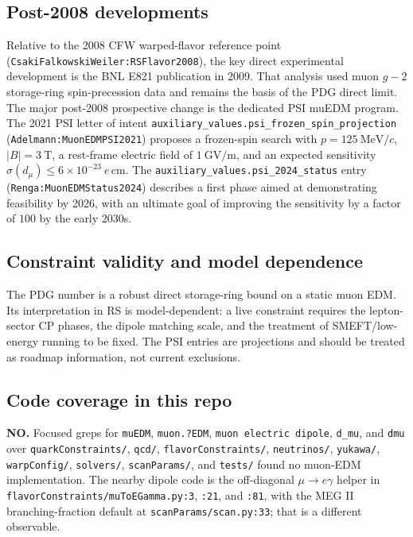 \subsection*{Post-2008 developments}
Relative to the 2008 CFW warped-flavor reference point
(\texttt{CsakiFalkowskiWeiler:RSFlavor2008}), the key direct experimental
development is the BNL E821 publication in 2009.  That analysis used muon
\(g-2\) storage-ring spin-precession data and remains the basis of the PDG
direct limit.  The major post-2008 prospective change is the dedicated PSI
muEDM program.  The 2021 PSI letter of intent
\texttt{auxiliary\_values.psi\_frozen\_spin\_projection}
(\texttt{Adelmann:MuonEDMPSI2021}) proposes a frozen-spin search with
\(p=125~\mathrm{MeV}/c\), \(|B|=3~\mathrm{T}\), a rest-frame electric field
of \(1~\mathrm{GV/m}\), and an expected sensitivity
\(\sigma(d_\mu)\leq6\times10^{-23}\ e\,\mathrm{cm}\).  The
\texttt{auxiliary\_values.psi\_2024\_status} entry
(\texttt{Renga:MuonEDMStatus2024}) describes a first phase aimed at
demonstrating feasibility by 2026, with an ultimate goal of improving the
sensitivity by a factor of \(100\) by the early 2030s.

\subsection*{Constraint validity and model dependence}
The PDG number is a robust direct storage-ring bound on a static muon EDM.
Its interpretation in RS is model-dependent: a live constraint requires the
lepton-sector CP phases, the dipole matching scale, and the treatment of
SMEFT/low-energy running to be fixed.  The PSI entries are projections and
should be treated as roadmap information, not current exclusions.

\subsection*{Code coverage in this repo}
\textbf{NO.}  Focused greps for \texttt{muEDM}, \texttt{muon.?EDM},
\texttt{muon electric dipole}, \texttt{d\_mu}, and \texttt{dmu} over
\texttt{quarkConstraints/}, \texttt{qcd/}, \texttt{flavorConstraints/},
\texttt{neutrinos/}, \texttt{yukawa/}, \texttt{warpConfig/},
\texttt{solvers/}, \texttt{scanParams/}, and \texttt{tests/} found no muon-EDM
implementation.  The nearby dipole code is the off-diagonal
\(\mu\to e\gamma\) helper in \texttt{flavorConstraints/muToEGamma.py:3},
\texttt{:21}, and \texttt{:81}, with the MEG II branching-fraction default at
\texttt{scanParams/scan.py:33}; that is a different observable.

